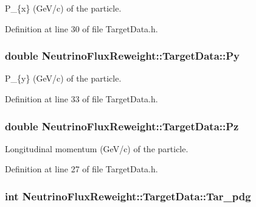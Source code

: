 P\-\_\-\{x\} (Ge\-V/c) of the particle. 



Definition at line 30 of file Target\-Data.\-h.

\hypertarget{class_neutrino_flux_reweight_1_1_target_data_a78fe35cea817ad13f0c68c6cd4b66b4a}{
\subsubsection[{Py}]{\setlength{\rightskip}{0pt plus 5cm}double Neutrino\-Flux\-Reweight\-::\-Target\-Data\-::\-Py}}\label{class_neutrino_flux_reweight_1_1_target_data_a78fe35cea817ad13f0c68c6cd4b66b4a}


P\-\_\-\{y\} (Ge\-V/c) of the particle. 



Definition at line 33 of file Target\-Data.\-h.

\hypertarget{class_neutrino_flux_reweight_1_1_target_data_a1db5829fbf43b237acc8e9094746028c}{
\subsubsection[{Pz}]{\setlength{\rightskip}{0pt plus 5cm}double Neutrino\-Flux\-Reweight\-::\-Target\-Data\-::\-Pz}}\label{class_neutrino_flux_reweight_1_1_target_data_a1db5829fbf43b237acc8e9094746028c}


Longitudinal momentum (Ge\-V/c) of the particle. 



Definition at line 27 of file Target\-Data.\-h.

\hypertarget{class_neutrino_flux_reweight_1_1_target_data_add174a11bb396898c7ce99c6340b2c42}{
\subsubsection[{Tar\-\_\-pdg}]{\setlength{\rightskip}{0pt plus 5cm}int Neutrino\-Flux\-Reweight\-::\-Target\-Data\-::\-Tar\-\_\-pdg}}\label{class_neutrino_flux_reweight_1_1_target_data_add174a11bb396898c7ce99c6340b2c42}


